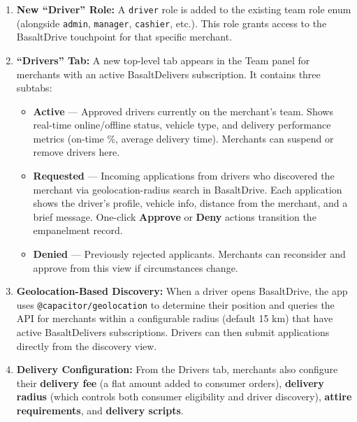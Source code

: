 \documentclass[11pt, letterpaper]{article}
\begin{document}
\begin{enumerate}
    \item \textbf{New ``Driver'' Role:} A \texttt{driver} role is added to the existing team role enum (alongside \texttt{admin}, \texttt{manager}, \texttt{cashier}, etc.). This role grants access to the BasaltDrive touchpoint for that specific merchant.
    \item \textbf{``Drivers'' Tab:} A new top-level tab appears in the Team panel for merchants with an active BasaltDelivers subscription. It contains three subtabs:
    \begin{itemize}
        \item \textbf{Active} --- Approved drivers currently on the merchant's team. Shows real-time online/offline status, vehicle type, and delivery performance metrics (on-time \%, average delivery time). Merchants can suspend or remove drivers here.
        \item \textbf{Requested} --- Incoming applications from drivers who discovered the merchant via geolocation-radius search in BasaltDrive. Each application shows the driver's profile, vehicle info, distance from the merchant, and a brief message. One-click \textbf{Approve} or \textbf{Deny} actions transition the empanelment record.
        \item \textbf{Denied} --- Previously rejected applicants. Merchants can reconsider and approve from this view if circumstances change.
    \end{itemize}
    \item \textbf{Geolocation-Based Discovery:} When a driver opens BasaltDrive, the app uses \texttt{@capacitor/geolocation} to determine their position and queries the API for merchants within a configurable radius (default 15 km) that have active BasaltDelivers subscriptions. Drivers can then submit applications directly from the discovery view.
    \item \textbf{Delivery Configuration:} From the Drivers tab, merchants also configure their \textbf{delivery fee} (a flat amount added to consumer orders), \textbf{delivery radius} (which controls both consumer eligibility and driver discovery), \textbf{attire requirements}, and \textbf{delivery scripts}.
\end{enumerate}
\end{document}
